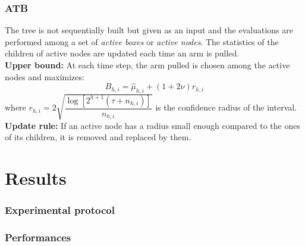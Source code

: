 \documentclass[xcolor={usenames,dvipsnames}]{beamer}
\begin{document}
\begin{frame}
\frametitle{ATB}
The tree is not sequentially built but given as an input and the evaluations are performed among a set of \textit{active boxes} or \textit{active nodes}. The statistics of the children of active nodes are updated each time an arm is pulled.\\
\textbf{Upper bound:} At each time step, the arm pulled is chosen among the active nodes and maximizes:
\begin{equation}
B_{h,i} = \widehat{\mu}_{h,i}+(1+2\nu)r_{h,i}
\end{equation}
where $r_{h,i}=2\sqrt{\dfrac{\log[2^{h+1}(\tau+n_{h,i})]}{n_{h,i}}}$ is the confidence radius of the interval.\\
\textbf{Update rule:} If an active node has a radius small enough compared to the ones of its children, it is removed and replaced by them.
\end{frame}

\section{Results}

\begin{frame}
\frametitle{Experimental protocol}
\end{frame}

\begin{frame}
\frametitle{Performances}
\end{frame}
\end{document}
